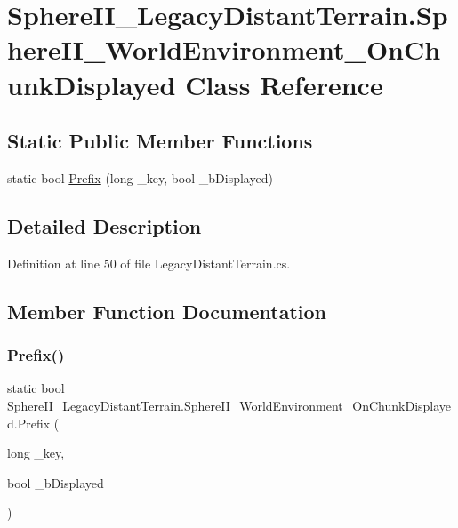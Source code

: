 \hypertarget{class_sphere_i_i___legacy_distant_terrain_1_1_sphere_i_i___world_environment___on_chunk_displayed}{}\section{Sphere\+I\+I\+\_\+\+Legacy\+Distant\+Terrain.\+Sphere\+I\+I\+\_\+\+World\+Environment\+\_\+\+On\+Chunk\+Displayed Class Reference}
\label{class_sphere_i_i___legacy_distant_terrain_1_1_sphere_i_i___world_environment___on_chunk_displayed}
\subsection*{Static Public Member Functions}
\begin{DoxyCompactItemize}
\item 
static bool \mbox{\hyperlink{class_sphere_i_i___legacy_distant_terrain_1_1_sphere_i_i___world_environment___on_chunk_displayed_a655f99739687547ab95ad8e9f492f44d}{Prefix}} (long \+\_\+key, bool \+\_\+b\+Displayed)
\end{DoxyCompactItemize}


\subsection{Detailed Description}


Definition at line 50 of file Legacy\+Distant\+Terrain.\+cs.



\subsection{Member Function Documentation}
\mbox{\label{class_sphere_i_i___legacy_distant_terrain_1_1_sphere_i_i___world_environment___on_chunk_displayed_a655f99739687547ab95ad8e9f492f44d}} 
\subsubsection{\texorpdfstring{Prefix()}{Prefix()}}
{\footnotesize\ttfamily static bool Sphere\+I\+I\+\_\+\+Legacy\+Distant\+Terrain.\+Sphere\+I\+I\+\_\+\+World\+Environment\+\_\+\+On\+Chunk\+Displayed.\+Prefix (\begin{DoxyParamCaption}\item[{long}]{\+\_\+key,  }\item[{bool}]{\+\_\+b\+Displayed }\end{DoxyParamCaption})\hspace{0.3cm}{\ttfamily [static]}}




